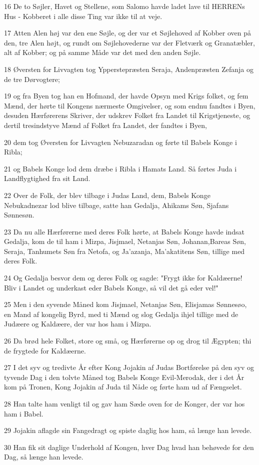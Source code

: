 \par 16 De to Søjler, Havet og Stellene, som Salomo havde ladet lave til HERRENs Hus - Kobberet i alle disse Ting var ikke til at veje.
\par 17 Atten Alen høj var den ene Søjle, og der var et Søjlehoved af Kobber oven på den, tre Alen højt, og rundt om Søjlehovederne var der Fletværk og Granatæbler, alt af Kobber; og på samme Måde var det med den anden Søjle.
\par 18 Øversten for Livvagten tog Ypperstepræsten Seraja, Andenpræsten Zefanja og de tre Dørvogtere;
\par 19 og fra Byen tog han en Hofmand, der havde Opsyn med Krigs folket, og fem Mænd, der hørte til Kongens nærmeste Omgivelser, og som endnu fandtes i Byen, desuden Hærførerens Skriver, der udskrev Folket fra Landet til Krigstjeneste, og dertil tresindstyve Mænd af Folket fra Landet, der fandtes i Byen,
\par 20 dem tog Øversten for Livvagten Nebuzaradan og førte til Babels Konge i Ribla;
\par 21 og Babels Konge lod dem dræbe i Ribla i Hamats Land. Så førtes Juda i Landflygtighed fra sit Land.
\par 22 Over de Folk, der blev tilbage i Judas Land, dem, Babels Konge Nebukadnezar lod blive tilbage, satte han Gedalja, Ahikams Søn, Sjafans Sønnesøn.
\par 23 Da nu alle Hærførerne med deres Folk hørte, at Babels Konge havde indsat Gedalja, kom de til ham i Mizpa, Jisjmael, Netanjas Søn, Johanan,Bareas Søn, Seraja, Tanhumets Søn fra Netofa, og Ja'azanja, Ma'akatitens Søn, tillige med deres Folk.
\par 24 Og Gedalja besvor dem og deres Folk og sagde: "Frygt ikke for Kaldæerne! Bliv i Landet og underkast eder Babels Konge, så vil det gå eder vel!"
\par 25 Men i den syvende Måned kom Jisjmael, Netanjas Søn, Elisjamas Sønnesøo, en Mand af kongelig Byrd, med ti Mænd og slog Gedalja ihjel tillige med de Judæere og Kaldæere, der var hos ham i Mizpa.
\par 26 Da brød hele Folket, store og små, og Hærførerne op og drog til Ægypten; thi de frygtede for Kaldæerne.
\par 27 I det syv og tredivte År efter Kong Jojakin af Judas Bortførelse på den syv og tyvende Dag i den tolvte Måned tog Babels Konge Evil-Merodak, der i det År kom på Tronen, Kong Jojakin af Juda til Nåde og førte ham ud af Fængselet.
\par 28 Han talte ham venligt til og gav ham Sæde oven for de Konger, der var hos ham i Babel.
\par 29 Jojakin aflagde sin Fangedragt og spiste daglig hos ham, så længe han levede.
\par 30 Han fik sit daglige Underhold af Kongen, hver Dag hvad han behøvede for den Dag, så længe han levede.



